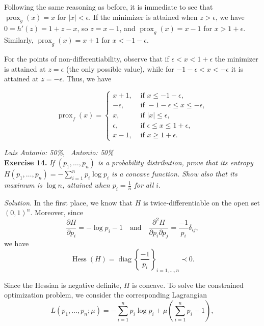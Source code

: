 \documentclass[12pt]{article}
\begin{document}
\begin{itemize}
Following the same reasoning as before, it is immediate to see that $\operatorname{prox}_g(x)=x$ for $|x|<\epsilon$. If the minimizer is attained when $z>\epsilon$, we have $0=h'(z)=1+z-x$, so $z=x-1$, and $\operatorname{prox}_g(x)=x-1$ for $x>1+\epsilon$. Similarly, $\operatorname{prox}_g(x)=x+1$ for $x< -1-\epsilon$.

For the points of non-differentiability, observe that if $\epsilon<x<1+\epsilon$ the minimizer is attained at $z=\epsilon$ (the only possible value), while for $-1-\epsilon<x<-\epsilon$ it is attained at $z=-\epsilon$. Thus, we have

        \[
             \operatorname{prox}_f(x)= \begin{cases}
               x+1, & \text{ if } x\leq - 1 - \epsilon,\\
               -\epsilon,  & \text{ if } -1-\epsilon\leq x\leq -\epsilon,\\
               x, & \text{ if } |x| \leq \epsilon,\\
               \epsilon,  & \text{ if } \epsilon \leq x \leq 1+\epsilon,\\
               x-1, & \text{ if } x \geq 1+\epsilon.
           \end{cases}
        \]
\end{itemize}

\vspace{1em}

\textit{Luis Antonio: 50\%}, \ \textit{Antonio: 50\%}\\
\textbf{Exercise 14. }\emph{If \( (p_1,\dots,p_n) \) is a probability distribution, prove that its entropy \( H(p_1, \dots, p_n) = - \sum_{i=1}^n p_i \log p_i\) is a concave function. Show also that its maximum is \( \log n \), attained when \( p_i = \frac{1}{n}\) for all $i$}.

\emph{Solution. } In the first place, we know that $H$ is twice-differentiable on the open set $(0,1)^n$. Moreover, since
\[
\frac{\partial H}{\partial p_i} = -\log p_i - 1 \quad \text{and} \quad \frac{\partial^2 H}{\partial p_i\partial p_j} = \frac{-1}{p_i}\delta_{ij},
\]
we have
\[
\operatorname{Hess}(H) = \operatorname{diag}\left\{\frac{-1}{p_i}\right\}_{i=1,\dots,n} \prec 0.
\]

Since the Hessian is negative definite, $H$ is concave. To solve the constrained optimization problem, we consider the corresponding Lagrangian
\[ L(p_1,\dots, p_n; \mu) = - \sum_{i=1}^n p_i \log p_i + \mu\left(\sum_{i=1}^n p_i - 1\right),\]
\end{document}
